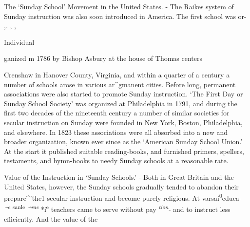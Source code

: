 \documentclass[]{book}
\begin{document}
The `Sunday School' Movement in the United States. - The Raikes system of Sunday instruction was also soon introduced in America. The first school was or- ,. , ,

Individual

ganized m 1786 by Bishop Asbury at the house of Thomas centers

Crenshaw in Hanover County, Virginia, and within a quarter of a century a number of schools arose in various ar\^{}gmanent cities. Before long, permanent associations were also started to promote Sunday instruction. `The First Day or Sunday School Society' was organized at Philadelphia in 1791, and during the first two decades of the nineteenth century a number of similar societies for secular instruction on Sunday were founded in New York, Boston, Philadelphia, and elsewhere. In 1823 these associations were all absorbed into a new and broader organization, known ever since as the `American Sunday School Union.' At the start it published suitable reading-books, and furnished primers, spellers, testaments, and hymn-books to needy Sunday schools at a reasonable rate.

Value of the Instruction in `Sunday Schools.' - Both in Great Britain and the United States, however, the Sunday schools gradually tended to abandon their prepare\^{}'the1 secular instruction and become purely religious. At varsai\textsuperscript{0}educa- \emph{\^{}\textsuperscript{e}} \textsuperscript{sanle} \emph{\^{}\textsuperscript{rae}} *i\textsuperscript{e} teachers came to serve without pay \emph{\textsuperscript{tion}-} and to instruct less efficiently. And the value of the
\end{document}
